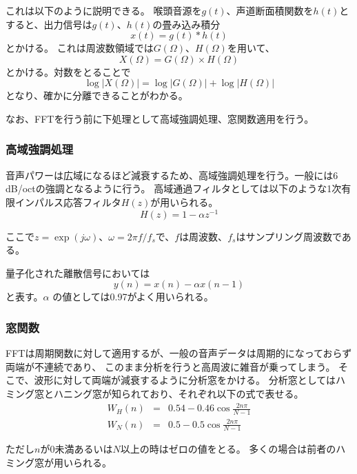 \documentclass[12ptj,a4j,dvipdfmx,uplatex, titlepage]{jsarticle}
\begin{document}
これは以下のように説明できる。
喉頭音源を$g(t)$、声道断面積関数を$h(t)$とすると、出力信号は$g(t)$、$h(t)$の畳み込み積分
\begin{equation}
    x(t) = g(t) * h(t)
\end{equation}
とかける。
これは周波数領域では$G(\Omega)$、$H(\Omega)$を用いて、
\begin{equation}
    X(\Omega) = G(\Omega) \times H(\Omega)
\end{equation}
とかける。対数をとることで
\begin{equation}
    \log |X(\Omega)| = \log |G(\Omega)| + \log |H(\Omega)|
\end{equation}
となり、確かに分離できることがわかる。


なお、FFTを行う前に下処理として高域強調処理、窓関数適用を行う。

\subsubsection{高域強調処理}
音声パワーは広域になるほど減衰するため、高域強調処理を行う。一般には6 \si{dB/oct}の強調となるように行う。
高域通過フィルタとしては以下のような1次有限インパルス応答フィルタ$H(z)$が用いられる。
\begin{equation}
    H(z) = 1 - \alpha z^{-1}
\end{equation}

ここで$z= \exp(j\omega)$、$\omega = 2\pi f/f_s$で、$f$は周波数、$f_s$はサンプリング周波数である。

量子化された離散信号においては
\begin{equation}
    y(n) = x(n) - \alpha x(n-1)
\end{equation}
と表す。$\alpha$ の値としては0.97がよく用いられる。

\subsubsection{窓関数}
FFTは周期関数に対して適用するが、一般の音声データは周期的になっておらず両端が不連続であり、
このまま分析を行うと高周波に雑音が乗ってしまう。
そこで、波形に対して両端が減衰するように分析窓をかける。
分析窓としてはハミング窓とハニング窓が知られており、それぞれ以下の式で表せる。
\begin{eqnarray}
    W_H (n) &=& 0.54 - 0.46 \cos \frac{2n\pi}{N-1} \\
    W_N (n) &=& 0.5 - 0.5 \cos \frac{2n\pi}{N-1}
\end{eqnarray}

ただし$n$が0未満あるいは$N$以上の時はゼロの値をとる。
多くの場合は前者のハミング窓が用いられる。
\end{document}
